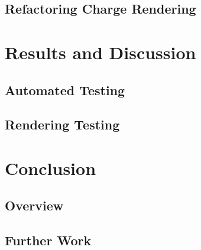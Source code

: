 \documentclass[nobib, a4paper, twoside, justified]{tufte-book}
\begin{document}
\section{Refactoring Charge Rendering}%
\label{sec:refactoring_charge_rendering}

\chapter{Results and Discussion}%
\label{cha:results_and_discussion}

\section{Automated Testing}%
\label{sec:automated_testing}

\section{Rendering Testing}%
\label{sec:rendering_testing}

\chapter{Conclusion}%
\label{cha:conclusion}

\section{Overview}%
\label{sec:overview}

\section{Further Work}%
\label{sec:further_work}



\backmatter

\printbibliography[heading=bibintoc]
\end{document}

